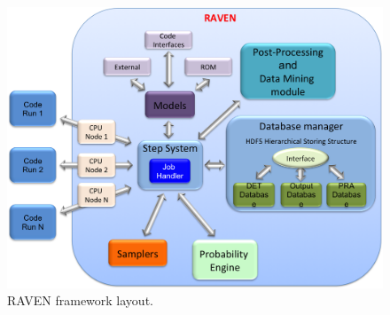 \begin{figure}[ht]
  \centering
  \includegraphics[width=1.0\textwidth]  {pics/RavenFramework.png}
  \caption{RAVEN framework layout.}
  \label{fig:RAVENframeworkLayout}
\end{figure}

